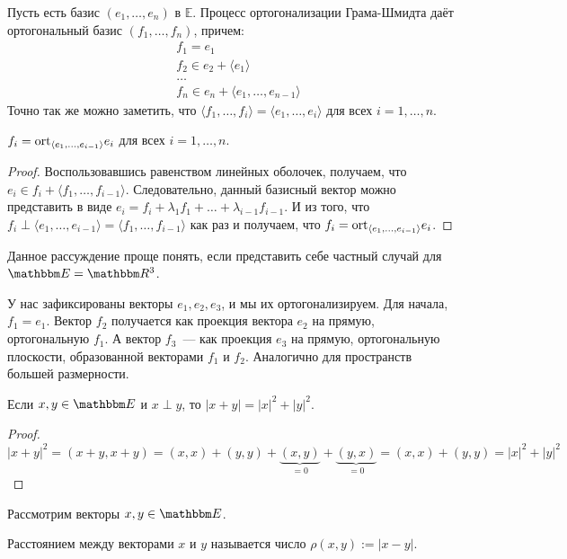 Пусть есть базис $(e_1, \ldots, e_n)$ в $\mathbb{E}$. Процесс ортогонализации Грама-Шмидта даёт ортогональный базис $(f_1, \ldots, f_n)$, причем:
\begin{align*}
	& f_1 = e_1\\
	& f_2 \in e_2 + \langle e_1 \rangle\\
	& \ldots\\
	& f_n  \in e_n + \langle e_1, \ldots, e_{n - 1} \rangle
\end{align*}
Точно так же можно заметить, что $\langle f_1, \ldots, f_i \rangle = \langle e_1, \ldots, e_i\rangle$ для всех $i= 1, \ldots, n$.
\begin{Suggestion}
	$f_i = \mathrm{ort}_{\langle e_1, \ldots, e_{i-1}\rangle} e_i$ для всех $i = 1, \ldots, n$.
\end{Suggestion}
\begin{proof}
Воспользовавшись равенством линейных оболочек, получаем, что \\$e_i \in f_i + \langle f_1, \ldots, f_{i-1}\rangle$. Следовательно, данный базисный вектор можно представить в виде $e_i = f_i + \lambda_1f_1 + \ldots + \lambda_{i -1} f_{i -1}$. И из того, что $f_i \perp \langle e_1, \ldots, e_{i -1} \rangle = \langle f_1, \ldots, f_{i - 1}\rangle$ как раз и получаем, что $f_i = \mathrm{ort}_{\langle e_1, \ldots, e_{i-1}\rangle} e_i$.
\end{proof}

\begin{Examples}
Данное рассуждение проще понять, если представить себе частный случай для $\E = \R^3$.

У нас зафиксированы векторы $e_1, e_2, e_3$, и мы их ортогонализируем. Для начала, $f_1 = e_1$. Вектор $f_2$ получается как проекция вектора $e_2$ на прямую, ортогональную $f_1$. А вектор $f_3$~--- как проекция $e_3$ на прямую, ортогональную плоскости, образованной векторами $f_1$ и $f_2$. Аналогично для пространств большей размерности.
\end{Examples}

\begin{Theorem}[Пифагора]
Если $x, y \in \E$ и $x \perp y$, то $|x+y| = |x|^2 + |y|^2$.
\end{Theorem}

\begin{proof}
	$$|x + y|^2 = (x+y, x+y) = (x, x) + (y, y) + \underbrace{(x, y)}_{=0} + \underbrace{(y, x)}_{=0} = (x, x) + (y, y) = |x|^2 + |y|^2$$
\end{proof}
Рассмотрим векторы $x, y \in \E$.
\begin{Def}
	Расстоянием между векторами $x$ и $y$ называется число $\rho(x,y) := |x-y|$.
\end{Def}

